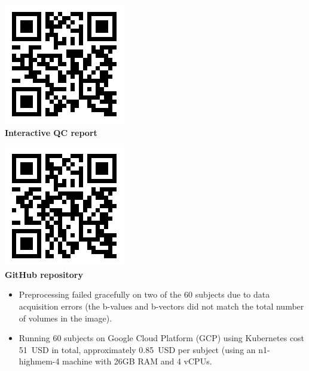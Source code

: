 \documentclass[a0, landscape]{a0poster}
\newenvironment{Figure}
  {\par\medskip\noindent\minipage{\linewidth}}
  {\endminipage\par\medskip}
\begin{document}
\begin{multicols}{3}
\begin{minipage}[b]{0.45\linewidth}
\begin{Figure}
    \centering
    \includegraphics[width=0.5\linewidth]{dmriprep_qc_dynamic_qr.png}\\
    \color{Navy} \textbf{Interactive QC report}
\end{Figure}
\end{minipage}
\begin{minipage}[b]{0.45\linewidth}
\begin{Figure}
    \centering
    \includegraphics[width=0.5\linewidth]{dmriprep_github_dynamic_qr.png}\\
    \color{Navy} \textbf{GitHub repository}
\end{Figure}
\end{minipage}

\begin{itemize}
    \item Preprocessing failed gracefully on two of the 60 subjects due to data acquisition errors (the b-values and b-vectors did not match the total number of volumes in the image).
    \item Running 60 subjects on Google Cloud Platform (GCP) using Kubernetes cost 51~USD in total, approximately 0.85~USD per subject (using an n1-highmem-4 machine with 26GB RAM and 4 vCPUs.
\end{itemize}


\end{multicols}
\end{document}
